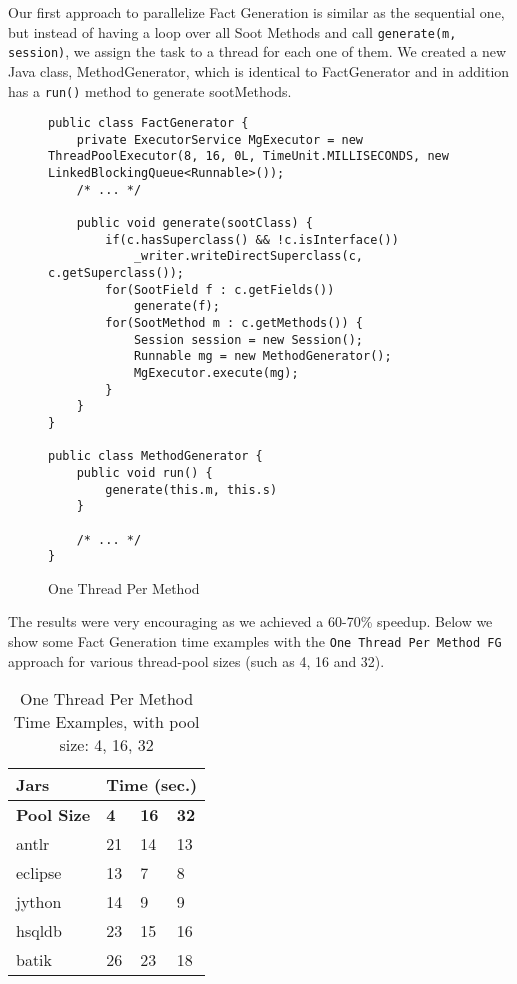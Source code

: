 \documentclass{dithesis}
\begin{document}
        Our first approach to parallelize Fact Generation is similar as the sequential one, but instead of having a loop over all Soot Methods and call \texttt{generate(m, session)}, we assign the task to a thread for each one of them. We created a new Java class, MethodGenerator, which is identical to FactGenerator and in addition has a \texttt{run()} method to generate sootMethods.
        \begin{figure}[H]
\begin{lstlisting}
public class FactGenerator {
    private ExecutorService MgExecutor = new ThreadPoolExecutor(8, 16, 0L, TimeUnit.MILLISECONDS, new LinkedBlockingQueue<Runnable>());
    /* ... */

    public void generate(sootClass) {
        if(c.hasSuperclass() && !c.isInterface())
            _writer.writeDirectSuperclass(c, c.getSuperclass());
        for(SootField f : c.getFields())
            generate(f);
        for(SootMethod m : c.getMethods()) {
            Session session = new Session();
            Runnable mg = new MethodGenerator();
            MgExecutor.execute(mg);
        }
    }
}

public class MethodGenerator {
    public void run() {
        generate(this.m, this.s)
    }

    /* ... */
}
\end{lstlisting}
        \caption{One Thread Per Method}
        \end{figure}

        The results were very encouraging as we achieved a 60-70\% speedup. Below we show some Fact Generation time examples with the \texttt{One Thread Per Method FG} approach for various thread-pool sizes (such as 4, 16 and 32).
		\begin{table}[H]
			\centering
            \begin{tabular}{@{}l|lll@{}}
            \toprule
            \textbf{Jars}    	& \multicolumn{3}{l}{\textbf{Time (sec.)}}  \\ \midrule
            \textbf{Pool Size} 	& \textbf{4}  & \textbf{16}  & \textbf{32}  \\ \midrule
            antlr            	& 21          & 14           & 13           \\
            eclipse          	& 13          & 7            & 8            \\
            jython           	& 14          & 9            & 9            \\
            hsqldb           	& 23          & 15           & 16           \\
            batik            	& 26          & 23           & 18           \\ \bottomrule
            \end{tabular}
            \newline
			\caption[One Thread Per Method Time Examples]{One Thread Per Method Time Examples, with pool size: 4, 16, 32}
		\end{table}
\end{document}
